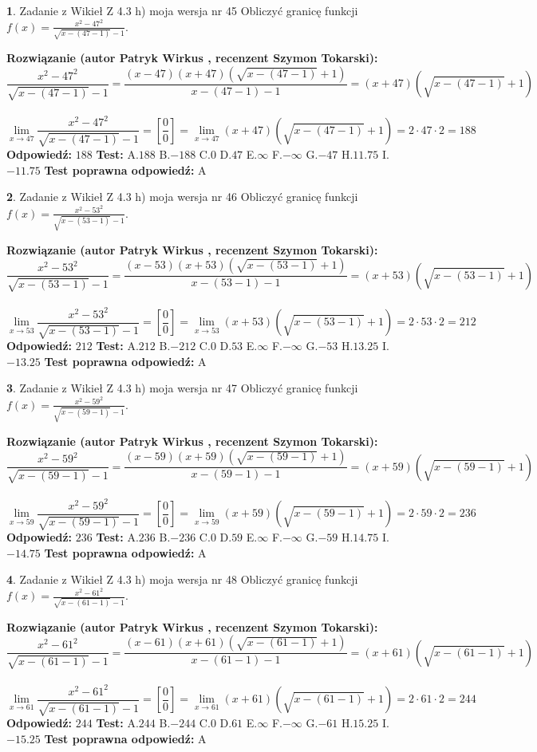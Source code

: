 \documentclass[12pt, a4paper]{article}
\theoremstyle{definition} %
\newtheorem{zad}{}
\newcommand{\zadStart}[1]{\begin{zad}#1\newline}
\newcommand{\zadStop}{\end{zad}}
\newcommand{\rozwStart}[2]{\noindent \textbf{Rozwiązanie (autor #1 , recenzent #2): }\newline}
\newcommand{\rozwStop}{\newline}
\newcommand{\odpStart}{\noindent \textbf{Odpowiedź:}\newline}
\newcommand{\odpStop}{\newline}
\newcommand{\testStart}{\noindent \textbf{Test:}\newline}
\newcommand{\testStop}{\newline}
\newcommand{\kluczStart}{\noindent \textbf{Test poprawna odpowiedź:}\newline}
\newcommand{\kluczStop}{\newline}
\begin{document}
\zadStart{Zadanie z Wikieł Z 4.3 h) moja wersja nr 45}
Obliczyć granicę funkcji $f(x)=\frac{x^{2} - 47^{2}}{\sqrt{x-(47-1)}-1}$.
\zadStop
\rozwStart{Patryk Wirkus}{Szymon Tokarski}
$$\frac{x^{2} - 47^{2}}{\sqrt{x-(47-1)}-1}=\frac{(x-47)(x+47)(\sqrt{x-(47-1)}+1)}{x-(47-1)-1}=(x+47)(\sqrt{x-(47-1)}+1)$$
\\
$$\lim\limits_{x\to 47}\frac{x^{2} - 47^{2}}{\sqrt{x-(47-1)}-1}=[\frac{0}{0}]=
\lim\limits_{x\to 47}(x+47)(\sqrt{x-(47-1)}+1) = 2\cdot47 \cdot 2 = 188$$
\rozwStop
\odpStart
$188$
\odpStop
\testStart
A.$188$
B.$-188$
C.$0$
D.$47$
E.$\infty$
F.$-\infty$
G.$-47$
H.$11.75$
I.$-11.75$
\testStop
\kluczStart
A
\kluczStop



\zadStart{Zadanie z Wikieł Z 4.3 h) moja wersja nr 46}
Obliczyć granicę funkcji $f(x)=\frac{x^{2} - 53^{2}}{\sqrt{x-(53-1)}-1}$.
\zadStop
\rozwStart{Patryk Wirkus}{Szymon Tokarski}
$$\frac{x^{2} - 53^{2}}{\sqrt{x-(53-1)}-1}=\frac{(x-53)(x+53)(\sqrt{x-(53-1)}+1)}{x-(53-1)-1}=(x+53)(\sqrt{x-(53-1)}+1)$$
\\
$$\lim\limits_{x\to 53}\frac{x^{2} - 53^{2}}{\sqrt{x-(53-1)}-1}=[\frac{0}{0}]=
\lim\limits_{x\to 53}(x+53)(\sqrt{x-(53-1)}+1) = 2\cdot53 \cdot 2 = 212$$
\rozwStop
\odpStart
$212$
\odpStop
\testStart
A.$212$
B.$-212$
C.$0$
D.$53$
E.$\infty$
F.$-\infty$
G.$-53$
H.$13.25$
I.$-13.25$
\testStop
\kluczStart
A
\kluczStop



\zadStart{Zadanie z Wikieł Z 4.3 h) moja wersja nr 47}
Obliczyć granicę funkcji $f(x)=\frac{x^{2} - 59^{2}}{\sqrt{x-(59-1)}-1}$.
\zadStop
\rozwStart{Patryk Wirkus}{Szymon Tokarski}
$$\frac{x^{2} - 59^{2}}{\sqrt{x-(59-1)}-1}=\frac{(x-59)(x+59)(\sqrt{x-(59-1)}+1)}{x-(59-1)-1}=(x+59)(\sqrt{x-(59-1)}+1)$$
\\
$$\lim\limits_{x\to 59}\frac{x^{2} - 59^{2}}{\sqrt{x-(59-1)}-1}=[\frac{0}{0}]=
\lim\limits_{x\to 59}(x+59)(\sqrt{x-(59-1)}+1) = 2\cdot59 \cdot 2 = 236$$
\rozwStop
\odpStart
$236$
\odpStop
\testStart
A.$236$
B.$-236$
C.$0$
D.$59$
E.$\infty$
F.$-\infty$
G.$-59$
H.$14.75$
I.$-14.75$
\testStop
\kluczStart
A
\kluczStop



\zadStart{Zadanie z Wikieł Z 4.3 h) moja wersja nr 48}
Obliczyć granicę funkcji $f(x)=\frac{x^{2} - 61^{2}}{\sqrt{x-(61-1)}-1}$.
\zadStop
\rozwStart{Patryk Wirkus}{Szymon Tokarski}
$$\frac{x^{2} - 61^{2}}{\sqrt{x-(61-1)}-1}=\frac{(x-61)(x+61)(\sqrt{x-(61-1)}+1)}{x-(61-1)-1}=(x+61)(\sqrt{x-(61-1)}+1)$$
\\
$$\lim\limits_{x\to 61}\frac{x^{2} - 61^{2}}{\sqrt{x-(61-1)}-1}=[\frac{0}{0}]=
\lim\limits_{x\to 61}(x+61)(\sqrt{x-(61-1)}+1) = 2\cdot61 \cdot 2 = 244$$
\rozwStop
\odpStart
$244$
\odpStop
\testStart
A.$244$
B.$-244$
C.$0$
D.$61$
E.$\infty$
F.$-\infty$
G.$-61$
H.$15.25$
I.$-15.25$
\testStop
\kluczStart
A
\kluczStop
\end{document}
